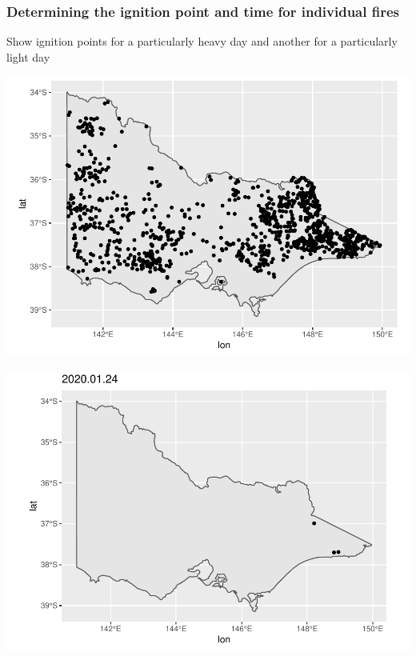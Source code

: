 \hypertarget{determining-the-ignition-point-and-time-for-individual-fires}{%
\subsubsection{Determining the ignition point and time for individual
fires}\label{determining-the-ignition-point-and-time-for-individual-fires}}

Show ignition points for a particularly heavy day and another for a
particularly light day

\begin{Schunk}

\includegraphics[width=0.8\linewidth]{clustering_paper_files/figure-latex/unnamed-chunk-2-1} \end{Schunk}

\begin{Schunk}

\includegraphics[width=0.8\linewidth]{clustering_paper_files/figure-latex/unnamed-chunk-4-1} \end{Schunk}

